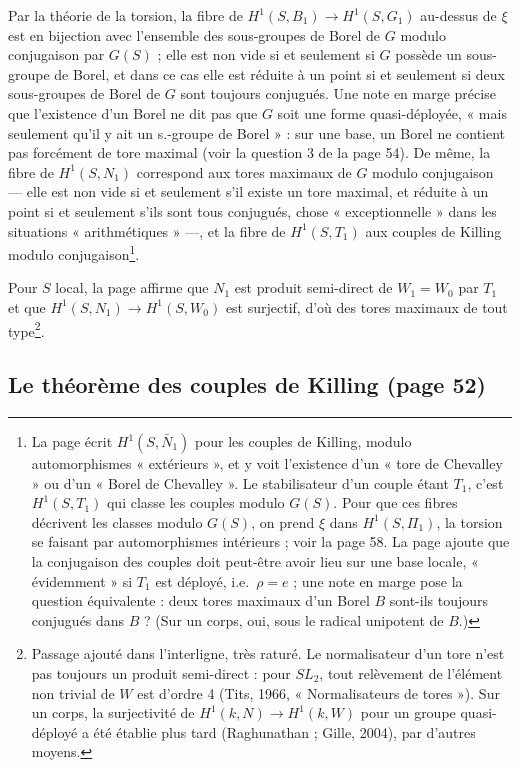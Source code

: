 \documentclass[11pt,a4paper]{article}
\begin{document}
Par la théorie de la torsion, la fibre de $H^1(S,B_1) \to H^1(S,G_1)$ au-dessus de
$\xi$ est en bijection avec l'ensemble des sous-groupes de Borel de $G$ modulo
conjugaison par $G(S)$ ; elle est non vide si et seulement si $G$ possède un
sous-groupe de Borel, et dans ce cas elle est réduite à un point si et
seulement si deux sous-groupes de Borel de $G$ sont toujours conjugués. Une
note en marge précise que l'existence d'un Borel ne dit pas que $G$ soit une
forme quasi-déployée, « mais seulement qu'il y ait un s.-groupe de Borel » :
sur une base, un Borel ne contient pas forcément de tore maximal (voir la
question 3 de la page 54). De même,
la fibre de $H^1(S,N_1)$ correspond aux tores maximaux de $G$ modulo
conjugaison — elle est non vide si et seulement s'il existe un tore maximal, et
réduite à un point si et seulement s'ils sont tous conjugués, chose
« exceptionnelle » dans les situations « arithmétiques » —, et la fibre de $H^1(S,T_1)$ aux couples de Killing modulo
conjugaison\footnote{La page écrit $H^1(S,\bar N_1)$ pour les couples de Killing,
modulo automorphismes « extérieurs », et y voit l'existence
d'un « tore de Chevalley » ou d'un « Borel de Chevalley ». Le stabilisateur d'un
couple étant $T_1$, c'est $H^1(S,T_1)$ qui classe les couples modulo $G(S)$. Pour
que ces fibres décrivent les classes modulo $G(S)$, on prend $\xi$ dans
$H^1(S,\Pi_1)$, la torsion se faisant par automorphismes intérieurs ; voir la
page 58. La page ajoute que la conjugaison des couples doit peut-être avoir lieu
sur une base locale, « évidemment » si $T_1$ est déployé, i.e.\ $\rho = e$ ; une
note en marge pose la question équivalente : deux tores maximaux d'un Borel $B$
sont-ils toujours conjugués dans $B$ ? (Sur un corps, oui, sous le radical
unipotent de $B$.)}.

Pour $S$ local, la page affirme que $N_1$ est produit semi-direct de $W_1 = W_0$
par $T_1$ et que $H^1(S,N_1) \to H^1(S,W_0)$ est surjectif, d'où des tores
maximaux de tout type\footnote{Passage ajouté dans l'interligne, très raturé. Le
normalisateur d'un tore n'est pas toujours un produit semi-direct : pour $SL_2$,
tout relèvement de l'élément non trivial de $W$ est d'ordre 4 (Tits, 1966,
« Normalisateurs de tores »). Sur un corps, la surjectivité de
$H^1(k,N) \to H^1(k,W)$ pour un groupe quasi-déployé a été établie plus tard
(Raghunathan ; Gille, 2004), par d'autres moyens.}.

\subsection*{Le théorème des couples de Killing (page 52)}
\end{document}
